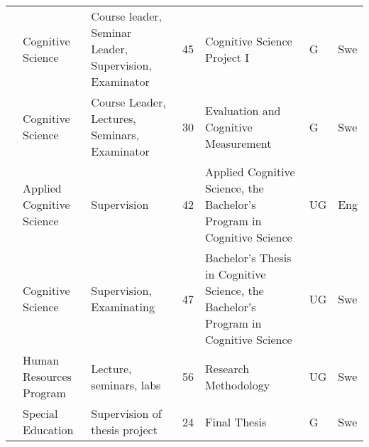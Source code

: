 \documentclass[]{article}
\begin{document}
\begin{landscape}
\begin{ThreePartTable}
\begin{longtable}[t]{l>{\raggedright\arraybackslash}p{5cm}>{\raggedright\arraybackslash}p{5cm}l>{\raggedright\arraybackslash}p{5cm}ll}
 & Cognitive Science & Course leader, Seminar Leader, Supervision, Examinator & 45 & Cognitive Science Project I & G & Swe\\
 & Cognitive Science & Course Leader, Lectures, Seminars, Examinator & 30 & Evaluation and Cognitive Measurement & G & Swe\\
\addlinespace
 & Applied Cognitive Science & Supervision & 42 & Applied Cognitive Science, the Bachelor's Program in Cognitive Science & UG & Eng\\
 & Cognitive Science & Supervision, Examinating & 47 & Bachelor's Thesis in Cognitive Science, the Bachelor's Program in Cognitive Science & UG & Swe\\
 & Human Resources Program & Lecture, seminars, labs & 56 & Research Methodology & UG & Swe\\
 & Special Education & Supervision of thesis project & 24 & Final Thesis & G & Swe\\*
\end{longtable}
\end{ThreePartTable}
\end{landscape}
\end{document}
